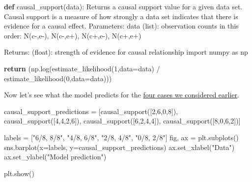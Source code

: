 \documentclass[
  letterpaper,
  DIV=11,
  numbers=noendperiod]{scrreprt}
\newenvironment{Shaded}{\begin{snugshade}}{\end{snugshade}}
\newcommand{\CommentTok}[1]{\textcolor[rgb]{0.37,0.37,0.37}{#1}}
\newcommand{\ControlFlowTok}[1]{\textcolor[rgb]{0.00,0.23,0.31}{\textbf{#1}}}
\newcommand{\DecValTok}[1]{\textcolor[rgb]{0.68,0.00,0.00}{#1}}
\newcommand{\ImportTok}[1]{\textcolor[rgb]{0.00,0.46,0.62}{#1}}
\newcommand{\KeywordTok}[1]{\textcolor[rgb]{0.00,0.23,0.31}{\textbf{#1}}}
\newcommand{\NormalTok}[1]{\textcolor[rgb]{0.00,0.23,0.31}{#1}}
\newcommand{\OperatorTok}[1]{\textcolor[rgb]{0.37,0.37,0.37}{#1}}
\newcommand{\StringTok}[1]{\textcolor[rgb]{0.13,0.47,0.30}{#1}}
\begin{document}
\begin{Shaded}
\begin{Highlighting}[]
\KeywordTok{def}\NormalTok{ causal\_support(data):}
  \CommentTok{\textquotesingle{}\textquotesingle{}\textquotesingle{}}
\CommentTok{  Returns a causal support value for a given data set.}
\CommentTok{  Causal support is a measure of how strongly a data}
\CommentTok{  set indicates that there is evidence for a causal}
\CommentTok{  effect.}
\CommentTok{     }
\CommentTok{  Parameters:}
\CommentTok{   data (list): observation counts in this order:}
\CommentTok{    N(c{-},e{-}), N(c{-},e+), N(c+,e{-}), N(c+,e+)}

\CommentTok{  Returns:}
\CommentTok{    (float): strength of evidence for causal relationship}
\CommentTok{  \textquotesingle{}\textquotesingle{}\textquotesingle{}}
  \ImportTok{import}\NormalTok{ numpy }\ImportTok{as}\NormalTok{ np}
  
  \ControlFlowTok{return}\NormalTok{ (np.log(estimate\_likelihood(}\DecValTok{1}\NormalTok{,data}\OperatorTok{=}\NormalTok{data) }\OperatorTok{/} 
\NormalTok{                 estimate\_likelihood(}\DecValTok{0}\NormalTok{,data}\OperatorTok{=}\NormalTok{data)))}
\end{Highlighting}
\end{Shaded}

Now let's see what the model predicts for the
\hyperref[structure-strength]{four cases we considered earlier}.

\begin{Shaded}
\begin{Highlighting}[]
\NormalTok{causal\_support\_predictions }\OperatorTok{=}\NormalTok{ [causal\_support([}\DecValTok{2}\NormalTok{,}\DecValTok{6}\NormalTok{,}\DecValTok{0}\NormalTok{,}\DecValTok{8}\NormalTok{]),}
\NormalTok{                              causal\_support([}\DecValTok{4}\NormalTok{,}\DecValTok{4}\NormalTok{,}\DecValTok{2}\NormalTok{,}\DecValTok{6}\NormalTok{]),}
\NormalTok{                              causal\_support([}\DecValTok{6}\NormalTok{,}\DecValTok{2}\NormalTok{,}\DecValTok{4}\NormalTok{,}\DecValTok{4}\NormalTok{]),}
\NormalTok{                              causal\_support([}\DecValTok{8}\NormalTok{,}\DecValTok{0}\NormalTok{,}\DecValTok{6}\NormalTok{,}\DecValTok{2}\NormalTok{])]}
                              
\NormalTok{labels }\OperatorTok{=}\NormalTok{ [}\StringTok{"6/8, 8/8"}\NormalTok{, }\StringTok{"4/8, 6/8"}\NormalTok{, }\StringTok{"2/8, 4/8"}\NormalTok{, }\StringTok{"0/8, 2/8"}\NormalTok{]}
\NormalTok{fig, ax }\OperatorTok{=}\NormalTok{ plt.subplots()}
\NormalTok{sns.barplot(x}\OperatorTok{=}\NormalTok{labels, y}\OperatorTok{=}\NormalTok{causal\_support\_predictions)}
\NormalTok{ax.set\_xlabel(}\StringTok{"Data"}\NormalTok{)}
\NormalTok{ax.set\_ylabel(}\StringTok{"Model prediction"}\NormalTok{)}

\NormalTok{plt.show()}
\end{Highlighting}
\end{Shaded}
\end{document}
